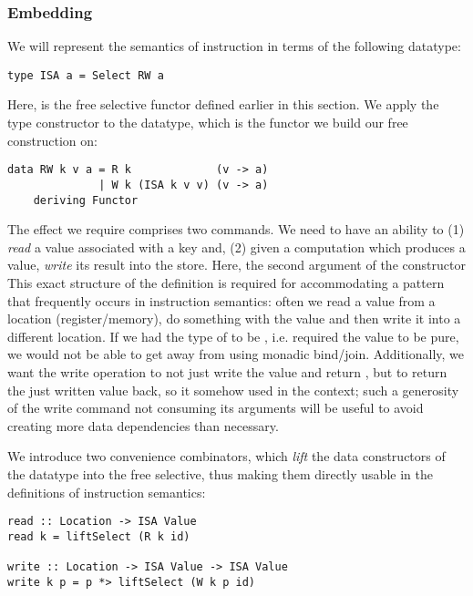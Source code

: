 \subsubsection{Embedding}

We will represent the semantics of instruction in terms of the following datatype:

\begin{verbatim}
type ISA a = Select RW a
\end{verbatim}

Here,  is the free selective functor defined earlier in this section.
We apply the  type constructor to the  datatype, which is the
functor we build our free construction on:

\begin{verbatim}
data RW k v a = R k             (v -> a)
              | W k (ISA k v v) (v -> a)
    deriving Functor
\end{verbatim}

The effect we require comprises two commands. We need to have an ability to (1)
\emph{read} a value associated with a key and, (2) given a computation which produces a value,
\emph{write} its result into the store. Here, the second argument of the  constructor
This exact structure of the definition is required for accommodating a pattern that
frequently occurs in instruction semantics: often we read a value from a location
(register/memory), do something with the value and then write it into a different location.
If we had the type of  to be , i.e. required the value to be pure,
we would not be able to get away from using monadic bind/join. Additionally, we want the write
operation to not just write the value and return \hs{()}, but to return the just written value
back, so it somehow used in the context; such a generosity of the write command not consuming
its arguments will be useful to avoid creating more data dependencies than necessary.

We introduce two convenience combinators, which \emph{lift} the data constructors
of the  datatype into the free selective, thus making them directly usable in
the definitions of instruction semantics:

\begin{verbatim}
read :: Location -> ISA Value
read k = liftSelect (R k id)

write :: Location -> ISA Value -> ISA Value
write k p = p *> liftSelect (W k p id)
\end{verbatim}

